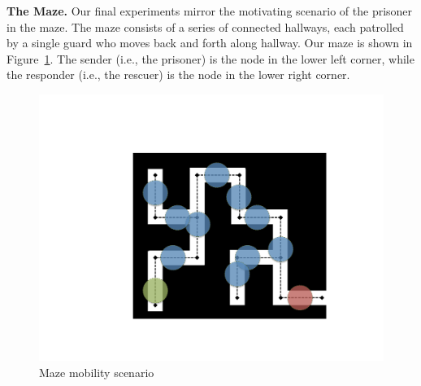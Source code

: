 {\bf The Maze.} Our final experiments mirror the motivating scenario
of the prisoner in the maze. The maze consists of a series of
connected hallways, each patrolled by a single guard who moves back
and forth along hallway. Our maze is shown in
Figure~\ref{fig:maze}. The sender (i.e., the prisoner) is the node in
the lower left corner, while the responder (i.e., the rescuer) is the
node in the lower right corner.
\begin{figure}
\begin{center}
\includegraphics[width=.7\columnwidth]{figures/newMaze.pdf}
\end{center}
\vspace{-.75cm}
\caption{Maze mobility scenario}
\label{fig:maze}
\vspace{-.25cm}
\end{figure}

